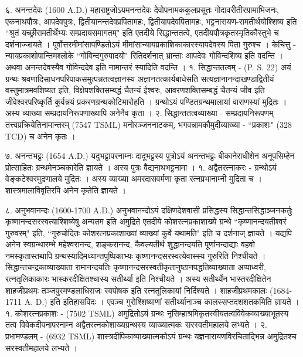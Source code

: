 ६. अनन्तदेवः (1600 A.D.)
महाराष्ट्रजोऽयमनन्तदेवः देवोपनामककुलप्रसूतः गोदावरीतीरग्रामाभिजनः, एकनाथपौत्रः, आपदेवपुत्रः, द्वितीयानन्तदेवप्रपितामहः, द्वितीयापदेवपितामहः, भट्टनारायण-रामतीर्थयोश्शिष्य इति ``श्रुतं यच्छ्रीरामतीर्थेभ्यः सम्प्रदायसमागतम्" इति एतदीये सिद्धान्ततत्वे, एतदीयपौत्रकृतस्मृतिकौस्तुभे च दर्शनाज्जायते । पूर्वोत्तरमीमांसापण्डितोऽयं मीमांसान्यायप्रकाशिकाकारस्यापदेवस्य पिता गुरुश्च ।
केचित्तु - न्यायप्रकाशोपान्तिमश्लोके ``गोविन्दगुरुपादयो" रितिदर्शनात् भ्रान्ताः आपदेवः गोविन्दशिष्य इति वदन्ति । अथवा अनन्तदेवस्यैव गोविन्ददेव इति नामान्तरं स्यादिति वदन्ति ।
१. सिद्धान्ततत्वम् - (P. S. 22)
अयं ग्रन्थः श्रवणादिसाधनपरिपाकसमुत्पन्नतत्वज्ञानस्य अज्ञानतत्कार्यबाधेसति सत्यज्ञानानन्दाखण्डाद्वितीयं वस्तुमात्रमवशिष्यत इति, विक्षेपशक्तिसम्बद्धं चैतन्यं ईश्वरः, आवरणशक्तिसम्बद्धं चैतन्यं जीव इति जीवेश्वरपरिष्कृर्ति कुर्वन्नयं प्रकरणग्रन्थकोटिमारोहति । ग्रन्थोऽयं पण्डितग्रन्थमालायां वाराणस्यां मुद्रितः । अस्य व्याख्या सम्प्रदायनिरूपणाख्यापि अनेनैव कृता ।
२. सिद्धान्ततत्वव्याख्या - सम्प्रदायनिरूपणम् तत्त्वप्रक्रियेतिनामान्तरम् (7547 TSML) मनोरञ्जननाटकम्,  भगवन्नामकौमुदीव्याख्या - ``प्रकाशः" (328 TCD) च अनेन कृतः ।

७. अनन्तभट्टः (1654 A.D.)
यदुभट्टापरनाम्नः दादूभट्टस्य पुत्रोऽयं अनन्तभट्टः बीकानेराधीशेन अनूपसिम्हेन प्रोत्साहितः ग्रन्थमेनञ्चकारेति ज्ञायते । अस्य पुत्रः वैद्यनाथभट्टनामा । १. अद्वैतरत्नाकरः - ग्रन्थोऽयं वेङ्कटेश्वरमुद्रणालये मुद्रितः । अस्य व्याख्या अमरदासवर्मणा कृता रत्नप्रभानाम्नी मुद्रिता च । शास्त्रमालाविवृतिरपि अनेन कृतेति ज्ञायते ।

८. अनुभवानन्दः (1600-1700 A.D.)
अनुभवानन्दोऽयं दक्षिणदेशवासी प्रसिद्धस्य सिद्धान्तसिद्धाञ्जनकर्तुः कृष्णानन्दसरस्वत्याश्शिष्येषु अन्यतम इति अमुद्रिते एतदीये कोशरत्नप्रकाशाख्ये ग्रन्थे ``कृष्णानन्दयतीश्वरं गुरुवरम्" इति, ``गुरुचोदितः कोशरत्नप्रकाशाख्यां व्याख्यां कुर्वे यथामति" इति च दर्शनाज् ज्ञायते । यद्यपि अनेन स्वग्रन्थारम्भे महेश्वरानन्द, शङ्करानन्द, कैवल्यतीर्थ शुद्धानन्दयति पूर्णानन्दाद्याः वहवो नमस्कृतास्तथापि ग्रन्थस्यादिमध्यान्तपुष्पिकाभ्यः कृष्णानन्दसरस्वत्येवास्स्य गुरुरिति निश्चीयते । सिद्धान्तचन्द्रकाव्याख्याता रामानन्दयतिः कृष्णानन्दसरस्वतीकृतानुष्ठानपद्धतिव्याख्याता अप्पाध्वरी, रत्नतृलिकाकारः भास्करदीक्षितश्चास्य सतीर्थ्या इति निश्चीयते ।
अस्य सतीर्थ्येन भास्तरदीक्षितेन शाहजीप्रथमः तञ्जपुरमण्डलाधिराजः स्वपोषक इति रत्नतूलिकायां निर्दिश्यते । शाहजीप्रथमकालः (1684-1711 A. D.) इति इतिहासविदः । एवञ्च गुरोश्शिष्याणां सतीर्थ्यानाञ्च कालस्सप्तदशशतकमिति ज्ञायते ।
१. कोशरत्नप्रकाशः - (7502 TSML)
अमुद्रितोऽयं ग्रन्थः नृसिम्हाश्रमिकृतस्वीयतत्वविवेकव्याख्याभूतस्य तत्व विवेकदीपनापरनाम्न अद्वैतरत्नकोशाख्यग्रन्थस्य व्याख्यात्मकः सरस्वतीमहालये लभ्यते ।
२. प्रभामण्डलम् - (6932 TSML) शास्त्रदीपिकाव्याख्यात्मकोऽयं ग्रन्थः यज्ञनारायणविरचिताद्भिन्न अमुद्रितश्च सरस्वतीमहालये लभ्यते ।

